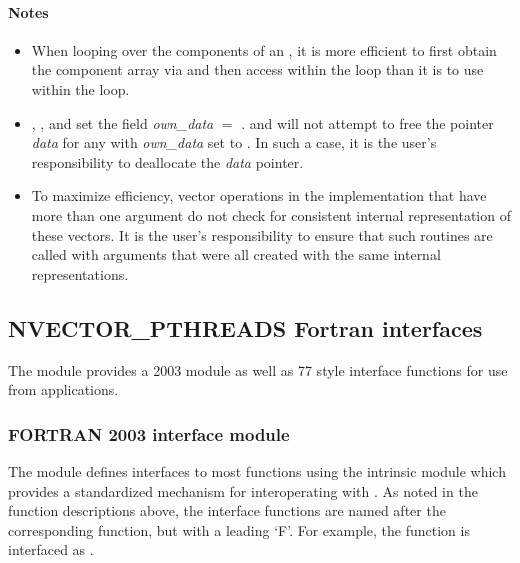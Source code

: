\paragraph{\bf Notes}                                                      
           
\begin{itemize}
                                        
\item
  When looping over the components of an  , it is     
  more efficient to first obtain the component array via       
   and then access  within the     
  loop than it is to use  within the loop.        

\item
  {\warn}, , 
  and  set the field 
  {\em own\_data} $=$ . 
   and 
  will not attempt to free the pointer {\em data} for any  with
  {\em own\_data} set to . In such a case, it is the user's responsibility to
  deallocate the {\em data} pointer.
                                     
\item
  {\warn}To maximize efficiency, vector operations in the {\nvecpthreads} implementation
  that have more than one  argument do not check for
  consistent internal representation of these vectors. It is the user's 
  responsibility to ensure that such routines are called with 
  arguments that were all created with the same internal representations.

\end{itemize}


\subsection{NVECTOR\_PTHREADS Fortran interfaces}
\label{ss:nvec_pthreads_fortran}

The {\nvecpthreads} module provides a {\F} 2003 module as well as {\F} 77
style interface functions for use from {\F} applications.

\subsubsection*{FORTRAN 2003 interface module}
The  {\F} module defines interfaces to most
{\nvecpthreads} {\CC} functions using the intrinsic 
module which provides a standardized mechanism for interoperating with {\CC}. As
noted in the {\CC} function descriptions above, the interface functions are
named after the corresponding {\CC} function, but with a leading `F'. For
example, the function  is interfaced as
.

